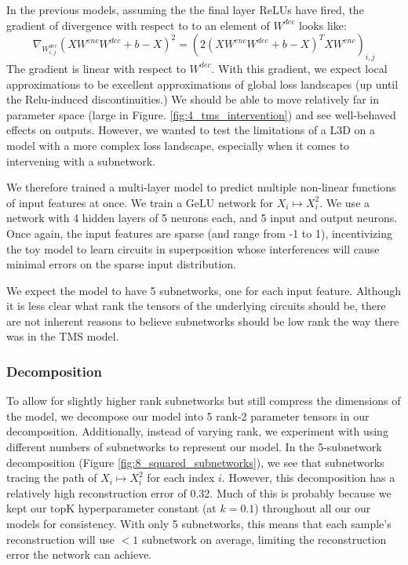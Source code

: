 \documentclass{article}
\theoremstyle{plain}
\theoremstyle{definition}
\theoremstyle{remark}
\begin{document}
In the previous models, assuming the the final layer ReLUs have fired, the gradient of divergence with respect to  to an element of $W^{dec}$ looks like:
\begin{equation}
  \nabla_{W^{dec}_{i,j}} ( X W^{enc}W^{dec} + b - X)^2 = (2 (X W^{enc} W^{dec} + b- X)^T X W^{enc})_{i,j}
\end{equation}
The gradient is linear with respect to $W^{dec}$. With this gradient, we expect local approximations to be excellent approximations of global loss landscapes (up until the Relu-induced discontinuities.) We should be able to move relatively far in parameter space (large \delta in Figure. \ref{fig:4_tms_intervention}) and see well-behaved effects on outputs. However, we wanted to test the limitations of a L3D on a model with a more complex loss landscape, especially when it comes to intervening with a subnetwork.

We therefore trained a multi-layer model to predict multiple non-linear functions of input features at once. We train a GeLU network for $X_i \mapsto X_i^2$. We use a network with 4 hidden layers of 5 neurons each, and 5 input and output neurons. Once again, the input features are sparse (and range from -1 to 1), incentivizing the toy model to learn circuits in superposition whose interferences will cause minimal errors on the sparse input distribution. 

We expect the model to have 5 subnetworks, one for each input feature. Although it is less clear what rank the tensors of the underlying circuits should be, there are not inherent reasons to believe subnetworks should be low rank the way there was in the TMS model. 

\subsubsection{Decomposition}

To allow for slightly higher rank subnetworks but still compress the dimensions of the model, we decompose our model into 5 rank-2 parameter tensors in our decomposition. Additionally, instead of varying rank, we experiment with using different numbers of subnetworks to represent our model. In the 5-subnetwork decomposition (Figure \ref{fig:8_squared_subnetworks}), we see that subnetworks tracing the path of $X_i \mapsto X_i^2$ for each index $i$. However, this decomposition has a relatively high reconstruction error of 0.32. Much of this is probably because we kept our $\text{topK}$ hyperparameter constant (at $k=0.1$) throughout all our our models for consistency.  With only 5 subnetworks, this means that each sample's reconstruction will use $<1$ subnetwork on average,  limiting the reconstruction error the network can achieve. 
\end{document}
